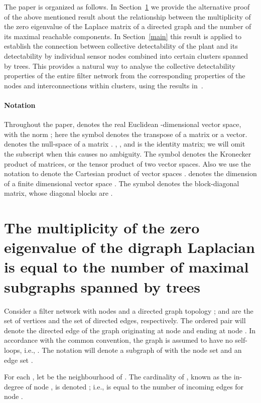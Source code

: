 \documentclass[a4paper,10pt,conference]{ieeeconf}
\begin{document}
The paper is organized as follows. In Section~\ref{Kirchhoff} we provide
the alternative proof of the above mentioned result about the relationship
between the multiplicity of the zero eigenvalue of the Laplace matrix of
a directed graph and the number of its maximal reachable components. In
Section~\ref{main} this result is  
applied to establish the connection between collective detectability of the
plant and its detectability by individual sensor nodes combined into certain
clusters spanned by trees. This provides a natural
way to analyse the collective detectability properties of the entire filter
network from the corresponding properties of the nodes and
interconnections within clusters, using the results in~\cite{U7b-journal}.

\paragraph*{Notation} Throughout the paper,  denotes the real
Euclidean -dimensional vector space, with the norm ; here the symbol  denotes the transpose of a matrix or a
vector.  denotes the null-space of a matrix . 
, 
, and
 is the identity matrix; we will omit the
subscript  when this causes no ambiguity. 
The symbol 
  denotes the Kronecker product of matrices, or the tensor product of two
  vector spaces. Also we use the notation  to
  denote the Cartesian product of  vector spaces .  denotes the dimension of a
  finite dimensional vector space . The symbol 
  denotes the block-diagonal matrix, whose  diagonal
  blocks are .     

\section{The multiplicity of the zero eigenvalue of the digraph Laplacian is
  equal to the number of maximal subgraphs spanned by trees}\label{Kirchhoff}
 
Consider a filter network with 
 nodes and a directed graph topology ;
 and  are the set of vertices and the
set of directed edges, 
respectively. The ordered pair  will denote the directed edge
of the graph originating at node  and ending at node . In accordance
with the common convention, the graph  is assumed to have no
self-loops, i.e., 
. The notation  will
denote a subgraph of  with the node set
 and an edge set
.    

For each , let 
be the neighbourhood of .  The cardinality of
, known as the in-degree of node , is denoted ; i.e.,
 is equal to the number of incoming edges for node . 
\end{document}
